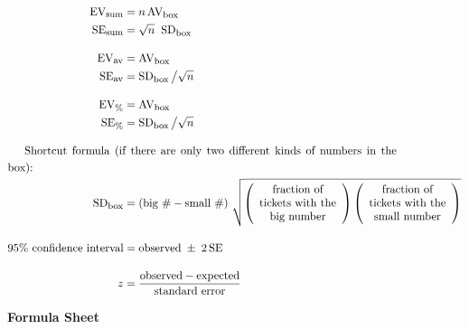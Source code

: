 \documentclass[10pt]{article}
\begin{document}
\begin{align*}
\mbox{EV}_{\mbox{\footnotesize sum}} & = n\,\mbox{AV}_{\mbox{\footnotesize box}}\\
\mbox{SE}_{\mbox{\footnotesize sum}} & = \sqrt{n}\;\;\mbox{SD}_{\mbox{\footnotesize box}}\\[10pt]
%
\mbox{EV}_{\mbox{\footnotesize av}} & = \mbox{AV}_{\mbox{\footnotesize box}}\\
\mbox{SE}_{\mbox{\footnotesize av}} & = \mbox{SD}_{\mbox{\footnotesize box}}\,\big{/}\sqrt{n}\\[10pt]
%
\mbox{EV}_{\mbox{\footnotesize \%}} & = \mbox{AV}_{\mbox{\footnotesize box}}\\
\mbox{SE}_{\mbox{\footnotesize \%}} & = \mbox{SD}_{\mbox{\footnotesize box}}\,\big{/}\sqrt{n}\\[10pt]
%
\noalign{Shortcut formula (if there are only two different kinds of numbers in the box):}
\mbox{SD}_{\mbox{\footnotesize box}} &=
  \left(\mbox{big \#} - \mbox{small \#}\right)\,\sqrt{
  \left(\begin{array}{c}\mbox{fraction of}\\ \mbox{tickets with the}\\ \mbox{big number}\end{array}\right)
  \left(\begin{array}{c}\mbox{fraction of}\\\mbox{tickets with the}\\\mbox{small number}\end{array}\right)}\\[10pt]
%
\mbox{95\% confidence interval} &= \mbox{observed} \;\pm\; 2\,\mbox{SE}\\[10pt]
z &= \frac{\mbox{observed} - \mbox{expected}}{\mbox{standard error}}
\end{align*}
\vfill

\begin{center}
\textbf{\large Formula Sheet}
\end{center}
\end{document}
